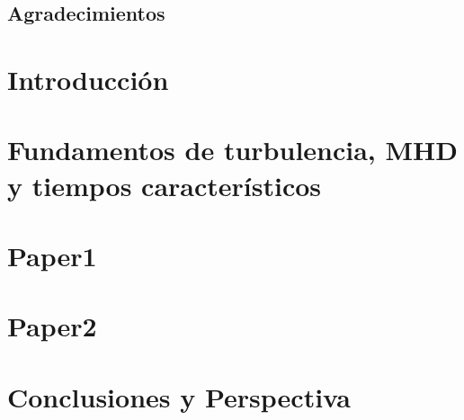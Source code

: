 \documentclass[12pt]{book}
\begin{document}
\section*{Agradecimientos}



\tableofcontents
\mainmatter
\chapter[Introducción]{Introducción}
\label{ch:introduccion}



\chapter[Fundamentos de turbulencia, MHD y tiempos característicos]{Fundamentos de turbulencia,  MHD y tiempos característicos}
\label{ch:fundamentos}


\chapter[Paper1]{Paper1}
\label{ch:P1}


\chapter[Paper2]{Paper2}
\label{ch:P2}


\chapter[Conclusiones y Perspectiva]{Conclusiones y Perspectiva}
\label{ch:conclusiones}








\end{document}
